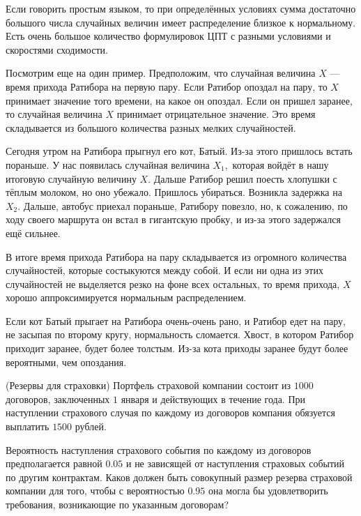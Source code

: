 \documentclass[12pt, a4paper, oneside]{article}
\begin{document}
Если говорить простым языком, то при определённых условиях сумма достаточно большого числа случайных величин имеет распределение близкое к нормальному. Есть очень большое количество формулировок ЦПТ с разными условиями и скоростями сходимости.  

Посмотрим еще на один пример. Предположим, что случайная величина $X$ --- время прихода Ратибора на первую пару. Если Ратибор опоздал на пару, то $X$ принимает значение того времени, на какое он опоздал. Если он пришел заранее, то случайная величина $X$ принимает отрицательное значение. Это время складывается из большого количества разных мелких случайностей. 

Сегодня утром на Ратибора прыгнул его кот, Батый. Из-за этого пришлось встать пораньше. У нас появилась случайная величина $X_1,$ которая войдёт в нашу итоговую случайную величину $X.$ Дальше Ратибор решил поесть хлопушки с тёплым молоком, но оно убежало. Пришлось убираться. Возникла задержка на $X_2.$  Дальше, автобус приехал пораньше, Ратибору повезло, но, к сожалению, по ходу своего маршрута он встал в гигантскую пробку, и из-за этого задержался ещё сильнее. 

В итоге время прихода Ратибора на пару складывается из огромного количества случайностей, которые состыкуются между собой. И если ни одна из этих случайностей не выделяется резко на фоне всех остальных, то время прихода, $X$ хорошо аппроксимируется нормальным распределением. 

Если кот Батый прыгает на Ратибора очень-очень рано, и Ратибор едет на пару, не засыпая по второму кругу, нормальность сломается. Хвост, в котором Ратибор приходит заранее, будет более толстым. Из-за кота приходы заранее будут более вероятными, чем опоздания.

\begin{problem}{(Резервы для страховки)}
Портфель страховой компании состоит из $1000$ договоров, заключенных $1$
января и действующих в течение года. При наступлении страхового случая по каждому из договоров компания обязуется выплатить $1500$ рублей.

Вероятность наступления страхового события по каждому из договоров предполагается равной $0.05$ и не зависящей от наступления страховых событий по другим контрактам. Каков должен быть совокупный размер резерва страховой компании для того, чтобы с вероятностью $0.95$ она могла бы удовлетворить требования, возникающие по указанным договорам?
\end{problem}
\end{document}
